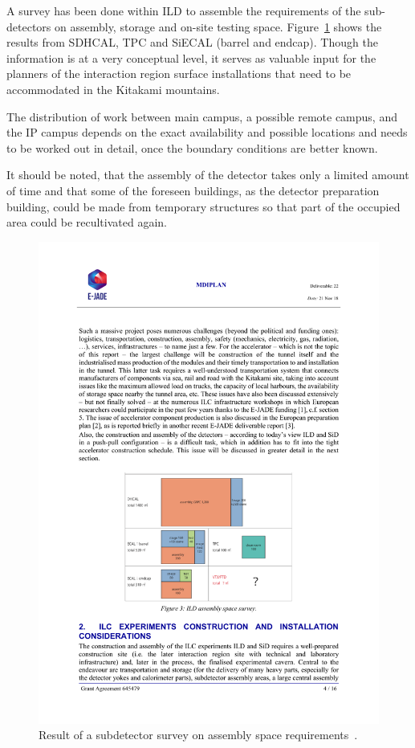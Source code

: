 A survey has been done within ILD to assemble the requirements of the sub-detectors on assembly, storage and on-site testing space. Figure~\ref{fig:integration:assembly_space} shows the results from SDHCAL, TPC and SiECAL (barrel and endcap). Though the information is at a very conceptual level, it serves as valuable input for the planners of the interaction region surface installations that need to be accommodated in the Kitakami mountains. 

The distribution of work between main campus, a possible remote campus, and the IP campus depends on the exact availability and possible locations and needs to be worked out in detail, once the boundary conditions are better known.

It should be noted, that the assembly of the detector takes only a limited amount of time and that some of the foreseen buildings, as the detector preparation building, could be made from temporary structures so that part of the occupied area could be recultivated again.

\begin{figure}[h!]
\centering
\includegraphics[width=0.8\hsize]{Integration/fig/assembly_space_survey.pdf}
\caption{\label{fig:integration:assembly_space}Result of a subdetector survey on assembly space requirements~\cite{ild:bib:ejade_mdi}.}
\end{figure}

